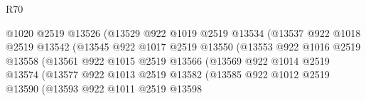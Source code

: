 \begin{lexlean}{R70}
\begin{coremodule}
                                        @1020
                                        @2519
                                        @13526
                                        (@13529
                                          @922
                                          @1019
                                          @2519
                                          @13534
                                          (@13537
                                            @922
                                            @1018
                                            @2519
                                            @13542
                                            (@13545
                                              @922
                                              @1017
                                              @2519
                                              @13550
                                              (@13553
                                                @922
                                                @1016
                                                @2519
                                                @13558
                                                (@13561
                                                  @922
                                                  @1015
                                                  @2519
                                                  @13566
                                                  (@13569
                                                    @922
                                                    @1014
                                                    @2519
                                                    @13574
                                                    (@13577
                                                      @922
                                                      @1013
                                                      @2519
                                                      @13582
                                                      (@13585
                                                        @922
                                                        @1012
                                                        @2519
                                                        @13590
                                                        (@13593
                                                          @922
                                                          @1011
                                                          @2519
                                                          @13598

\end{coremodule}
\end{lexlean}
